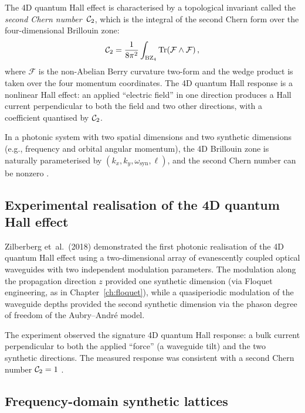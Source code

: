 The 4D quantum Hall effect is characterised by a topological
invariant called the \emph{second Chern number}~$\mathcal{C}_2$, which is
the integral of the second Chern form over the four-dimensional
Brillouin zone:
\begin{equation}\label{eq:ch16-second-chern-integral}
  \mathcal{C}_2 = \frac{1}{8\pi^2}\int_{\mathrm{BZ}_4}
  \operatorname{Tr}(\mathcal{F}\wedge\mathcal{F})\,,
\end{equation}
where $\mathcal{F}$ is the non-Abelian Berry curvature two-form and
the wedge product is taken over the four momentum coordinates.  The
4D quantum Hall response is a nonlinear Hall effect: an applied
``electric field'' in one direction produces a Hall current
perpendicular to both the field and two other directions, with a
coefficient quantised by $\mathcal{C}_2$.

In a photonic system with two spatial dimensions and two synthetic
dimensions (e.g., frequency and orbital angular momentum), the 4D
Brillouin zone is naturally parameterised by $(k_x, k_y,
\omega_{\mathrm{syn}}, \ell)$, and the second Chern number can be
nonzero \cite{ozawa2018topological,price2022roadmap}.

\subsection{Experimental realisation of the 4D quantum Hall effect}
\label{sec:ch16-4d-experiment}

Zilberberg et~al.\ (2018) demonstrated the first photonic
realisation of the 4D quantum Hall effect using a two-dimensional
array of evanescently coupled optical waveguides with two
independent modulation parameters.  The modulation along the
propagation direction $z$ provided one synthetic dimension (via
Floquet engineering, as in Chapter~\ref{ch:floquet}), while a
quasiperiodic modulation of the waveguide depths provided the
second synthetic dimension via the phason degree of freedom of the
Aubry--Andr\'e model.

The experiment observed the signature 4D quantum Hall response: a
bulk current perpendicular to both the applied ``force'' (a
waveguide tilt) and the two synthetic directions.  The measured
response was consistent with a second Chern number $\mathcal{C}_2=1$
\cite{price2022roadmap}.

\subsection{Frequency-domain synthetic lattices}
\label{sec:ch16-frequency-lattice}

